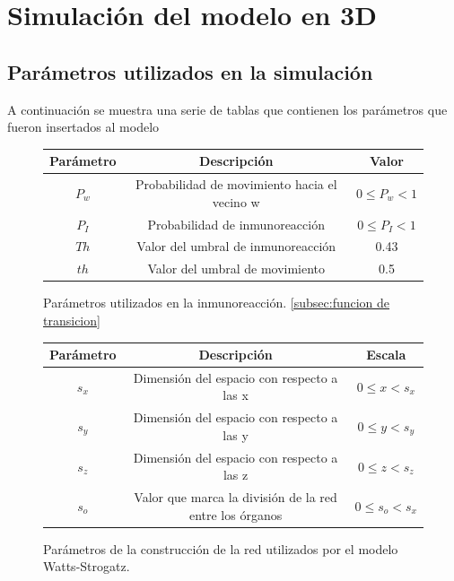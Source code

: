 \documentclass[12pt]{amsart}
\begin{document}
\newpage
\section{\bf{Simulaci\'on del modelo en 3D}}
\subsection{Par\'ametros utilizados en la simulaci\'on }
A continuaci\'on se muestra una serie de tablas que contienen los par\'ametros que fueron insertados al modelo %

\begin{figure}[h!]%
		\begin{center}
			\begin{tabular}{|c|c|c|} \hline
			Par\'ametro & Descripci\'on  	                       & Valor 	\\ \hline
			$P_w$       & Probabilidad de movimiento hacia el vecino w&$0 \leq P_w  < 1  $			\\ \hline
			$P_I$ 	    & Probabilidad de inmunoreacci\'on         &$0 \leq P_I  < 1  $			\\ \hline
			$Th$		& Valor del umbral de inmunoreacci\'on     & 0.43			\\ \hline
			$th$		& Valor del umbral de movimiento           & 0.5 			\\ \hline
			\end{tabular}
		\caption{Par\'ametros utilizados en la inmunoreacci\'on. \label{fig:inmune_param}\ref{subsec:funcion de transicion}}
		\end{center}
		\end{figure}

\begin{figure}[h!]%
		\begin{center}
			\begin{tabular}{|c|c|c|} \hline
			Par\'ametro & Descripci\'on  	                       & Escala 	\\ \hline
			$s_x$ & Dimensi\'on del espacio con respecto a las x    & $0 \leq x < s_x$      			\\ \hline
            $s_y$ & Dimensi\'on del espacio con respecto a las y    &	$0 \leq y < s_y$\\ \hline
            $s_z$ & Dimensi\'on del espacio con respecto a las z    &	$0 \leq z < s_z$\\ \hline
			$s_o$		      & Valor que marca la divisi\'on de la red entre los \'organos  & $0 \leq s_o < s_x $    \\ \hline
			\end{tabular}
		\caption{Par\'ametros de la construcci\'on de la red utilizados por el modelo Watts-Strogatz. \label{table-network-params}}
		\end{center}
		\end{figure}
\end{document}
